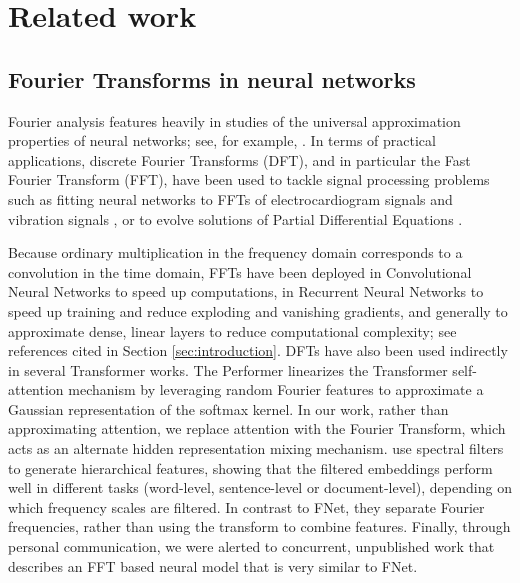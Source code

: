 \section{Related work}
\label{sec:related_work}

\subsection{Fourier Transforms in neural networks}
\label{subsec:fourier_transforms_neural_networks}

Fourier analysis features heavily in studies of the universal approximation properties of neural networks; see, for example, \citep{cybenko1989approximation, barron1993universal}. In terms of practical applications, discrete Fourier Transforms (DFT), and in particular the Fast Fourier Transform (FFT), have been used to tackle signal processing problems such as fitting neural networks to FFTs of electrocardiogram signals \citep{minami1999real, gothwal2011cardiac, mironovova2015fast} and vibration signals \citep{zhang2013fault}, or to evolve solutions of Partial Differential Equations \citep{li2020fourier}.

Because ordinary multiplication in the frequency domain corresponds to a convolution in the time domain, FFTs have been deployed in Convolutional Neural Networks to speed up computations, in Recurrent Neural Networks to speed up training and reduce exploding and vanishing gradients, and generally to approximate dense, linear layers to reduce computational complexity; see references cited in Section \ref{sec:introduction}. DFTs have also been used indirectly in several Transformer works. The Performer \citep{choromanski2020masked} linearizes the Transformer self-attention mechanism by leveraging random Fourier features to approximate a Gaussian representation of the softmax kernel. In our work, rather than approximating attention, we replace attention with the Fourier Transform, which acts as an alternate hidden representation mixing mechanism.  \citet{tamkin2020language} use spectral filters to generate hierarchical features, showing that the filtered embeddings perform well in different tasks (word-level, sentence-level or document-level), depending on which frequency scales are filtered. In contrast to FNet, they separate Fourier frequencies, rather than using the transform to combine features.
Finally, through personal communication, we were alerted to concurrent, unpublished work \citep{backurs2021note} that describes an FFT based neural model that is very similar to FNet.



